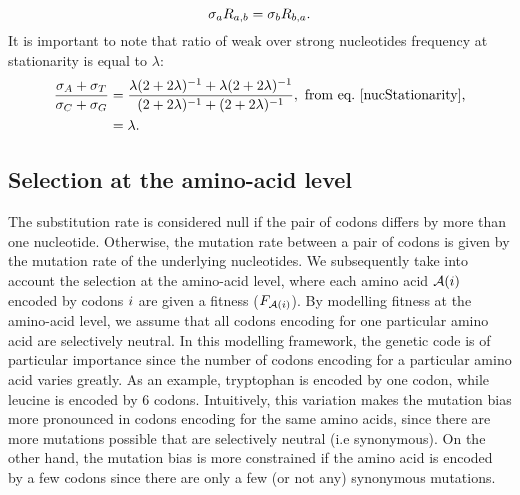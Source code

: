 \begin{equation}
    \sigma_a R_{a, b} =\sigma_b R_{b, a}.
    \label{nucMutBalance}
\end{equation}
It is important to note that ratio of weak over strong nucleotides frequency at stationarity is equal to $\lambda$:
\begin{align}
    \label{lambda}
    \dfrac{ \mutequi_A + \mutequi_T }{ \mutequi_C + \mutequi_G }
    & = \dfrac{ \lambda ( 2 + 2 \lambda)^{-1} + \lambda ( 2 + 2 \lambda)^{-1}}{ ( 2 + 2 \lambda)^{-1} + ( 2 + 2 \lambda)^{-1}}, \ \text{from eq.~\ref{nucStationarity},}\\
    & = \lambda.
\end{align}

\subsection{Selection at the amino-acid level}
\label{sec:mut-bias-aa-selection}
The substitution rate is considered null if the pair of codons differs by more than one nucleotide.
Otherwise, the mutation rate between a pair of codons is given by the mutation rate of the underlying nucleotides.
We subsequently take into account the selection at the amino-acid level, where each amino acid $\mathcal{A}({i})$ encoded by codons ${i}$ are given a fitness ($F_{\mathcal{A}({i})}$).
By modelling fitness at the amino-acid level, we assume that all codons encoding for one particular amino acid are selectively neutral.
In this modelling framework, the genetic code is of particular importance since the number of codons encoding for a particular amino acid varies greatly.
As an example, tryptophan is encoded by one codon, while leucine is encoded by 6 codons.
Intuitively, this variation makes the mutation bias more pronounced in codons encoding for the same amino acids, since there are more mutations possible that are selectively neutral (i.e synonymous).
On the other hand, the mutation bias is more constrained if the amino acid is encoded by a few codons since there are only a few (or not any) synonymous mutations.

